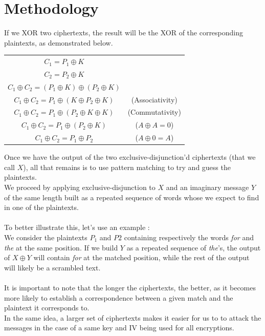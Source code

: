 \documentclass[a4paper,11pt]{article}
\begin{document}
\section{Methodology}

If we XOR two ciphertexts, the result will be the XOR of the corresponding plaintexts, as demonstrated below. \cite{StackExchange:3} \cite{StackExchange:2}

\begin{center}
\begin{tabular}{cc}
$ C_1 = P_1 \oplus K $ &  \\
$ C_2 = P_2 \oplus K $ &  \\
$ C_1 \oplus C_2 = (P_1 \oplus K) \oplus (P_2 \oplus K) $ & \\
$ C_1 \oplus C_2 = P_1 \oplus (K \oplus P_2 \oplus K) $ & (Associativity) \\
$ C_1 \oplus C_2 = P_1 \oplus (P_2 \oplus K \oplus K) $ & (Commutativity) \\
$ C_1 \oplus C_2 = P_1 \oplus (P_2 \oplus K) $  & ($ A \oplus A = 0 $) \\
$ C_1 \oplus C_2 = P_1 \oplus P_2 $ & ($ A \oplus 0 = A $)
\end{tabular}
\end{center}

\noindent

Once we have the output of the two exclusive-disjunction'd ciphertexts (that we call $X$), all that remains is to use pattern matching to try and guess the plaintexts. \\
We proceed by applying exclusive-disjunction to $X$ and an imaginary message $Y$ of the same length  built as a repeated sequence of words whose we expect to find in one of the plaintexts. \cite{StackExchange:1}\\
\\
To better illustrate this, let's use an example : \\
We consider the plaintexts $P_1$ and $P2$ containing respectively the words \textit{for} and \textit{the} at the same position. If we build $Y$ as a repeated sequence of \textit{the}'s, the output of $X \oplus Y$ will contain \textit{for} at the matched position, while the rest of the output will likely be a scrambled text. \\
\\
It is important to note that the longer the ciphertexts, the better, as it becomes more likely to establish a correspondence between a given match and the plaintext it corresponds to. \\
In the same idea, a larger set of ciphertexts makes it easier for us to to attack the messages in the case of a same key and IV being used for all encryptions.\\
\end{document}
